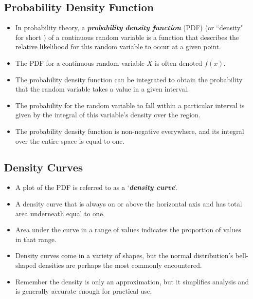 \documentclass[a4paper,12pt]{article}
\begin{document}
\subsection*{Probability Density Function}
\begin{itemize}
	\item
	In probability theory, a \textbf{\emph{probability density function}} (PDF) (or ``density" for short ) of a continuous random variable is a function that describes the relative likelihood for this random variable to occur at a given point.
	
	\item The PDF for a continuous random variable $X$ is often denoted $f(x)$.
	
	\item The probability density function can be integrated to obtain the probability that the random variable takes a value in a given interval.
	
	\item The probability for the random variable to fall within a particular interval is given by the integral of this variable's density over the region.
	
	\item The probability density function is non-negative everywhere, and its integral over the entire space is equal to one.
\end{itemize}

\subsection*{Density Curves}


\begin{itemize}
	\item A plot of the PDF is referred to as a `\textbf{\emph{density curve}}'.
	\item A density curve that is always on or above the horizontal axis and has total area underneath equal to one.
	\item Area under the curve in a range of values indicates the proportion of values in that range.
	\item Density curves come in a variety of shapes, but the normal distribution's bell-shaped densities are perhaps the most commonly encountered.
	\item Remember the density is only an approximation, but it simplifies analysis and is generally accurate enough for practical use.
\end{itemize}
\end{document}
